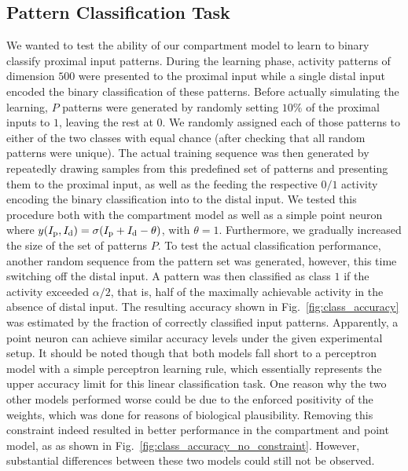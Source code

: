 \documentclass[10pt,a4paper]{article}
\begin{document}
\subsection{Pattern Classification Task}

We wanted to test the ability of our compartment model to learn to binary classify proximal input patterns. During the learning phase, activity patterns of dimension $500$ were presented to the proximal input while a single distal input encoded the binary classification of these patterns. Before actually simulating the learning, $P$ patterns were generated by randomly setting $10\%$ of the proximal inputs to $1$, leaving the rest at $0$. We randomly assigned each of those patterns to either of the two classes with equal chance (after checking that all random patterns were unique). The actual training sequence was then generated by repeatedly drawing samples from this predefined set of patterns and presenting them to the proximal input, as well as the feeding the respective $0/1$ activity encoding the binary classification into to the distal input. We tested this procedure both with the compartment model as well as a simple point neuron where $y(I_{\rm p},I_{\rm d}) = \sigma(I_{\rm p}+I_{\rm d} - \theta)$, with $\theta = 1$. Furthermore, we gradually increased the size of the set of patterns $P$. To test the actual classification performance, another random sequence from the pattern set was generated, however, this time switching off the distal input. A pattern was then classified as class $1$ if the activity exceeded $\alpha/2$, that is, half of the maximally achievable activity in the absence of distal input. The resulting accuracy shown in Fig.~\ref{fig:class_accuracy} was estimated by the fraction of correctly classified input patterns. Apparently, a point neuron can achieve similar accuracy levels under the given experimental setup. It should be noted though that both models fall short to a perceptron model with a simple perceptron learning rule, which essentially represents the upper accuracy limit for this linear classification task. One reason why the two other models performed worse could be due to the enforced positivity of the weights, which was done for reasons of biological plausibility. Removing this constraint indeed resulted in better performance in the compartment and point model, as as shown in Fig.~\ref{fig:class_accuracy_no_constraint}. However, substantial differences between these two models could still not be observed.
\end{document}
